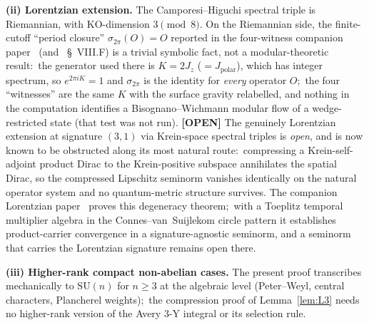 \documentclass[11pt,a4paper]{article}
\theoremstyle{plain}
\theoremstyle{definition}
\newcommand{\SU}{\mathrm{SU}}
\begin{document}
\textbf{(ii) Lorentzian extension.} The Camporesi--Higuchi spectral
triple is Riemannian, with KO-dimension $3 \pmod 8$. On the
Riemannian side, the finite-cutoff ``period closure''
$\sigma_{2\pi}(O) = O$ reported in the four-witness companion
paper~\cite{paper42} (and \cite{paper32}~\S~VIII.F) is a trivial
symbolic fact, not a modular-theoretic result:\ the generator used there
is $K = 2J_z$ ($= J_{\mathrm{polar}}$), which has integer spectrum, so
$e^{2\pi i K} = 1$ and $\sigma_{2\pi}$ is the identity for \emph{every}
operator $O$;\ the four ``witnesses'' are the same $K$ with the surface
gravity relabelled, and nothing in the computation identifies a
Bisognano--Wichmann modular flow of a wedge-restricted state (that test
was not run).  %
\textbf{[OPEN]} The
genuinely Lorentzian extension at signature $(3, 1)$ via Krein-space
spectral triples is \emph{open}, and is now known to be obstructed
along its most natural route:\ compressing a Krein-self-adjoint
product Dirac to the Krein-positive subspace annihilates the spatial
Dirac, so the compressed Lipschitz seminorm vanishes identically on
the natural operator system and no quantum-metric structure survives.
The companion Lorentzian paper~\cite{paper45} proves this degeneracy
theorem;\ with a Toeplitz temporal multiplier algebra in the
Connes--van~Suijlekom circle pattern it establishes product-carrier
convergence in a signature-agnostic seminorm, and a seminorm that
carries the Lorentzian signature remains open there.

\textbf{(iii) Higher-rank compact non-abelian cases.} The present
proof transcribes mechanically to $\SU(n)$ for $n \ge 3$ at the
algebraic level (Peter--Weyl, central characters, Plancherel weights);\
the compression proof of Lemma~\ref{lem:L3} needs no higher-rank version
of the Avery 3-Y integral or its selection rule.
\end{document}
